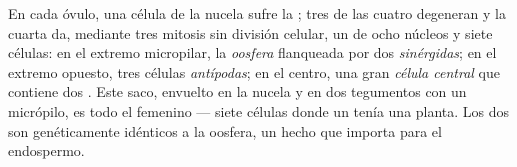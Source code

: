 \begin{proposition}\label{prop:b2:angiosperm-reproduction:embryosac}
En cada óvulo, una célula  de la nucela sufre la ; tres
de las cuatro  degeneran y la cuarta da, mediante tres mitosis
sin división celular, un \emph{} de ocho núcleos y siete
células: en el extremo micropilar, la \emph{oosfera}
flanqueada por dos \emph{sinérgidas}; en el extremo opuesto, tres células
\emph{antípodas}; en el centro, una gran \emph{célula central} que
contiene dos \emph{}. Este saco, envuelto en la nucela y
en dos tegumentos con un micrópilo, es todo el  femenino ---
siete células donde un  tenía una planta. Los dos 
son genéticamente idénticos a la oosfera, un hecho que importa para el
endospermo.
\end{proposition}

